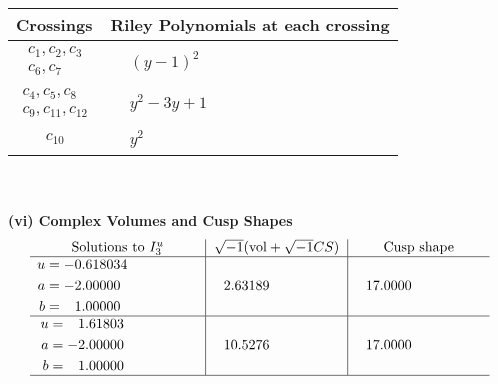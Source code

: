\documentclass[1p]{elsarticle_modified}
\theoremstyle{definition}
\newcommand{\I}{\sqrt{-1}}
\begin{document}
\begin{tabular}{m{50pt}|m{274pt}}
Crossings & \hspace{64pt}Riley Polynomials at each crossing \\
\hline $$\begin{aligned}c_{1},c_{2},c_{3}\\c_{6},c_{7}\end{aligned}$$&$\begin{aligned}
&(y-1)^2
\end{aligned}$\\
\hline $$\begin{aligned}c_{4},c_{5},c_{8}\\c_{9},c_{11},c_{12}\end{aligned}$$&$\begin{aligned}
&y^2-3 y+1
\end{aligned}$\\
\hline $$\begin{aligned}c_{10}\end{aligned}$$&$\begin{aligned}
&y^2
\end{aligned}$\\
\hline
\end{tabular}\\~\\
\newpage\flushleft \textbf{(vi) Complex Volumes and Cusp Shapes}
$$\begin{array}{c|c|c}  
\text{Solutions to }I^u_{3}& \I (\text{vol} + \sqrt{-1}CS) & \text{Cusp shape}\\
 \hline 
\begin{aligned}
u &= -0.618034\phantom{ +0.000000I} \\
a &= -2.00000\phantom{ +0.000000I} \\
b &= \phantom{-}1.00000\phantom{ +0.000000I}\end{aligned}
 & \phantom{-}2.63189\phantom{ +0.000000I} & \phantom{-}17.0000\phantom{ +0.000000I} \\ \hline\begin{aligned}
u &= \phantom{-}1.61803\phantom{ +0.000000I} \\
a &= -2.00000\phantom{ +0.000000I} \\
b &= \phantom{-}1.00000\phantom{ +0.000000I}\end{aligned}
 & \phantom{-}10.5276\phantom{ +0.000000I} & \phantom{-}17.0000\phantom{ +0.000000I}\\
 \hline 
 \end{array}$$\newpage\newpage\renewcommand{\arraystretch}{1}
\end{document}
